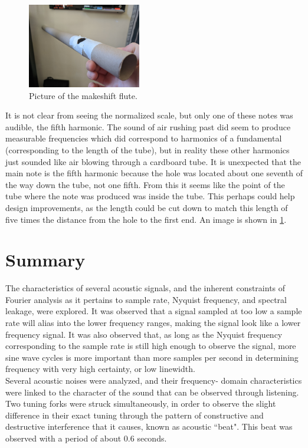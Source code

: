 \documentclass[aps,prl,reprint]{revtex4-2}
\begin{document}
\begin{figure}[h]
\includegraphics[width=0.44\textwidth]{../Images/l5_optional_flute.jpg}
\caption{\label{flute} Picture of the makeshift flute. }
\end{figure}

It is not clear from seeing the normalized scale, but only one of
these notes was audible, the fifth harmonic. The sound of air
rushing past did seem to produce measurable frequencies which
did correspond to harmonics of a fundamental (corresponding
to the length of the tube), but in reality these other harmonics
just sounded like air blowing through a cardboard tube. It is
unexpected that the main note is the fifth harmonic because
the hole was located about one seventh of the way down the tube,
not one fifth. From this it seems like the point of the tube
where the note was produced was inside the tube. This perhaps
could help design improvements, as the length could be cut down
to match this length of five times the distance from the hole
to the first end. An image is shown in \ref{flute}.



\section{Summary}

The characteristics of several acoustic signals,
and the inherent constraints of Fourier analysis as it pertains
to sample rate, Nyquist frequency, and spectral leakage, were
explored. It was observed that a signal sampled at too
low a sample rate will alias into the lower frequency ranges,
making the signal look like a lower frequency signal. 
It was also observed that, as long as the Nyquist frequency
corresponding to the sample rate is still high enough
to observe the signal, more sine wave cycles is more
important than more samples per second in determining
frequency with very high certainty, or low linewidth. \\

Several acoustic noises were analyzed, and their frequency-
domain characteristics were linked to the character of the
sound that can be observed through listening.
Two tuning forks were struck simultaneously, in order to 
observe the slight difference in their exact tuning through
the pattern of constructive and destructive interference
that it causes, known as acoustic ``beat". This beat was
observed with a period of about 0.6 seconds. \\
\end{document}
